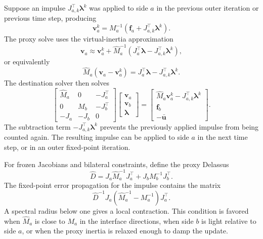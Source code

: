 \documentclass[11pt]{article}
\newcommand{\va}{\bm v_a}
\newcommand{\vb}{\bm v_b}
\newcommand{\ubar}{\bar{\bm u}}
\newcommand{\fa}{\bm f_a}
\newcommand{\fb}{\bm f_b}
\newcommand{\lam}{\bm\lambda}
\newcommand{\Ja}{J_a}
\newcommand{\Jb}{J_b}
\newcommand{\Ma}{M_a}
\newcommand{\Mb}{M_b}
\newcommand{\Mhat}{\widehat M_a}
\newcommand{\Dhat}{\widehat D}
\begin{document}
Suppose an impulse $J_{a,k}^\top\lam^k$ was applied to side $a$ in the previous outer
iteration or previous time step, producing
\begin{equation}
    \va^k = \Ma^{-1}\left(\fa + J_{a,k}^\top\lam^k\right).
    \label{eq:lagged-va}
\end{equation}
The proxy solve uses the virtual-inertia approximation
\begin{equation}
    \va
    \approx
    \va^k
    + \Mhat^{-1}\left(\Ja^\top\lam - J_{a,k}^\top\lam^k\right),
    \label{eq:virtual-inertia-update}
\end{equation}
or equivalently
\begin{equation}
    \Mhat(\va-\va^k)=\Ja^\top\lam-J_{a,k}^\top\lam^k.
    \label{eq:virtual-inertia-increment}
\end{equation}
The destination solver then solves
\begin{equation}
\begin{bmatrix}
\Mhat & 0 & -\Ja^\top \\
0 & \Mb & -\Jb^\top \\
-\Ja & -\Jb & 0
\end{bmatrix}
\begin{bmatrix}
\va \\ \vb \\ \lam
\end{bmatrix}
=
\begin{bmatrix}
\Mhat\va^k - J_{a,k}^\top\lam^k \\
\fb \\
-\ubar
\end{bmatrix}.
\label{eq:proxy-kkt}
\end{equation}
The subtraction term $-J_{a,k}^\top\lam^k$ prevents the previously applied impulse from
being counted again. The resulting impulse can be applied to side $a$ in the next time
step, or in an outer fixed-point iteration.

For frozen Jacobians and bilateral constraints, define the proxy Delassus
\[
    \Dhat = \Ja\Mhat^{-1}\Ja^\top + \Jb\Mb^{-1}\Jb^\top .
\]
The fixed-point error propagation for the impulse contains the matrix
\begin{equation}
    \Dhat^{-1}\Ja\left(\Mhat^{-1}-\Ma^{-1}\right)\Ja^\top .
    \label{eq:proxy-convergence}
\end{equation}
A spectral radius below one gives a local contraction. This condition is favored when
$\Mhat$ is close to $\Ma$ in the interface directions, when side $b$ is light relative
to side $a$, or when the proxy inertia is relaxed enough to damp the update.
\end{document}
